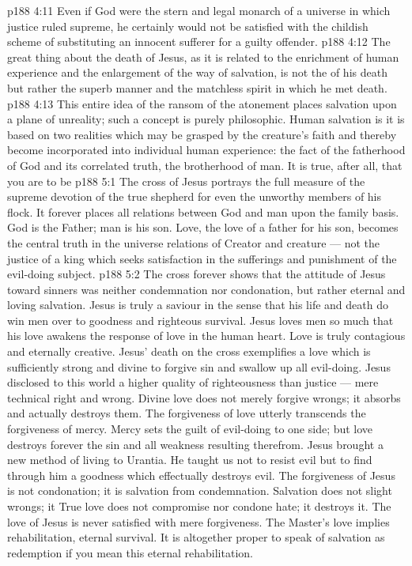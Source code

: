 \vs p188 4:11 Even if God were the stern and legal monarch of a universe in which justice ruled supreme, he certainly would not be satisfied with the childish scheme of substituting an innocent sufferer for a guilty offender.
\vs p188 4:12 The great thing about the death of Jesus, as it is related to the enrichment of human experience and the enlargement of the way of salvation, is not the  of his death but rather the superb manner and the matchless spirit in which he met death.
\vs p188 4:13 This entire idea of the ransom of the atonement places salvation upon a plane of unreality; such a concept is purely philosophic. Human salvation is  it is based on two realities which may be grasped by the creature’s faith and thereby become incorporated into individual human experience: the fact of the fatherhood of God and its correlated truth, the brotherhood of man. It is true, after all, that you are to be 
\vs p188 5:1 The cross of Jesus portrays the full measure of the supreme devotion of the true shepherd for even the unworthy members of his flock. It forever places all relations between God and man upon the family basis. God is the Father; man is his son. Love, the love of a father for his son, becomes the central truth in the universe relations of Creator and creature --- not the justice of a king which seeks satisfaction in the sufferings and punishment of the evil\hyp{}doing subject.
\vs p188 5:2 The cross forever shows that the attitude of Jesus toward sinners was neither condemnation nor condonation, but rather eternal and loving salvation. Jesus is truly a saviour in the sense that his life and death do win men over to goodness and righteous survival. Jesus loves men so much that his love awakens the response of love in the human heart. Love is truly contagious and eternally creative. Jesus’ death on the cross exemplifies a love which is sufficiently strong and divine to forgive sin and swallow up all evil\hyp{}doing. Jesus disclosed to this world a higher quality of righteousness than justice --- mere technical right and wrong. Divine love does not merely forgive wrongs; it absorbs and actually destroys them. The forgiveness of love utterly transcends the forgiveness of mercy. Mercy sets the guilt of evil\hyp{}doing to one side; but love destroys forever the sin and all weakness resulting therefrom. Jesus brought a new method of living to Urantia. He taught us not to resist evil but to find through him a goodness which effectually destroys evil. The forgiveness of Jesus is not condonation; it is salvation from condemnation. Salvation does not slight wrongs; it  True love does not compromise nor condone hate; it destroys it. The love of Jesus is never satisfied with mere forgiveness. The Master’s love implies rehabilitation, eternal survival. It is altogether proper to speak of salvation as redemption if you mean this eternal rehabilitation.
